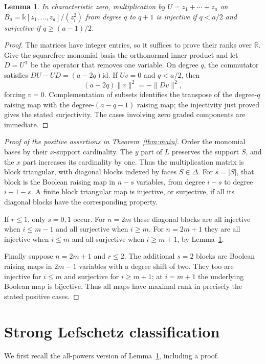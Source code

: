 \documentclass[11pt]{article}
\newtheorem{lemma}[theorem]{Lemma}
\theoremstyle{remark}
\newcommand{\kk}{\mathbb{k}}
\begin{document}
\begin{lemma}\label{lem:boolean}
In characteristic zero, multiplication by $U=z_1+\cdots+z_a$ on $B_a=\kk[z_1,\ldots,z_a]/(z_i^2)$ from degree $q$ to $q+1$ is injective if $q<a/2$ and surjective if $q\geq(a-1)/2$.
\end{lemma}
\begin{proof}
The matrices have integer entries, so it suffices to prove their ranks over $\mathbb R$. Give the squarefree monomial basis the orthonormal inner product and let $D=U^{\mathsf T}$ be the operator that removes one variable. On degree $q$, the commutator satisfies $DU-UD=(a-2q)\mathrm{id}$. If $Uv=0$ and $q<a/2$, then
\[
(a-2q)\lVert v\rVert^2=-\lVert Dv\rVert^2,
\]
forcing $v=0$. Complementation of subsets identifies the transpose of the degree-$q$ raising map with the degree-$(a-q-1)$ raising map; the injectivity just proved gives the stated surjectivity. The cases involving zero graded components are immediate.
\end{proof}

\begin{proof}[Proof of the positive assertions in Theorem~\ref{thm:main}]
Order the monomial bases by their $x$-support cardinality. The $y$ part of $L$ preserves the support $S$, and the $x$ part increases its cardinality by one. Thus the multiplication matrix is block triangular, with diagonal blocks indexed by faces $S\in\Delta$. For $s=|S|$, that block is the Boolean raising map in $n-s$ variables, from degree $i-s$ to degree $i+1-s$. A finite block triangular map is injective, or surjective, if all its diagonal blocks have the corresponding property.

If $r\leq1$, only $s=0,1$ occur. For $n=2m$ these diagonal blocks are all injective when $i\leq m-1$ and all surjective when $i\geq m$. For $n=2m+1$ they are all injective when $i\leq m$ and all surjective when $i\geq m+1$, by Lemma~\ref{lem:boolean}.

Finally suppose $n=2m+1$ and $r\leq2$. The additional $s=2$ blocks are Boolean raising maps in $2m-1$ variables with a degree shift of two. They too are injective for $i\leq m$ and surjective for $i\geq m+1$; at $i=m+1$ the underlying Boolean map is bijective. Thus all maps have maximal rank in precisely the stated positive cases.
\end{proof}

\section{Strong Lefschetz classification}
We first recall the all-powers version of Lemma~\ref{lem:boolean}, including a proof.
\end{document}

